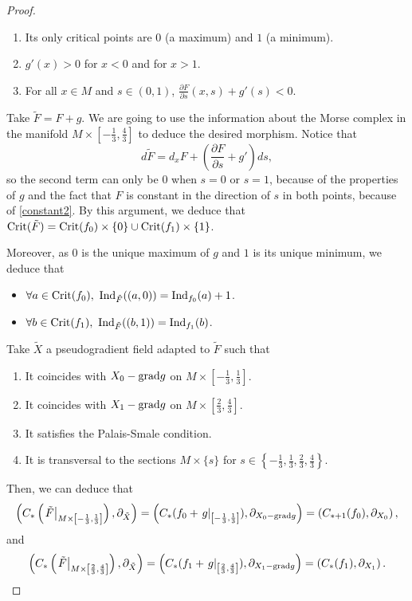\begin{proof}
\begin{enumerate}
	\item Its only critical points are $0$ (a maximum) and $1$ (a minimum).
	\item $g'(x) > 0$ for $x < 0$ and for $x > 1$.
	\item For all $x \in M$ and $s \in (0,1)$, $\frac{\partial F}{\partial s}(x,s) + g'(s) < 0$.
\end{enumerate}

Take $\tilde{F} = F + g$. We are going to use the information about the Morse complex in the manifold $M \times \left[-\frac13,\frac43\right]$ to deduce the desired morphism. Notice that
\begin{displaymath}
d\tilde{F} = d_xF + \left( \frac{\partial F}{\partial s} + g' \right) d s ,
\end{displaymath}
so the second term can only be $0$ when $s=0$ or $s=1$, because of the properties of $g$ and the fact that $F$ is constant in the direction of $s$ in both points, because of \ref{constant2}. By this argument, we deduce that $\mathrm{Crit}(\tilde{F}) = \mathrm{Crit}(f_0) \times \{0\} \cup \mathrm{Crit}(f_1) \times \{1\}$.

Moreover, as $0$ is the unique maximum of $g$ and $1$ is its unique minimum, we deduce that

\begin{itemize}
	\item $\forall a \in \crit(f_0), \ \indx_{\tilde{F}}((a,0)) = \indx_{f_0}(a) + 1$.
	\item $\forall b \in \crit(f_1), \ \indx_{\tilde{F}}((b,1)) = \indx_{f_1}(b)$.
\end{itemize}

Take $\tilde{X}$ a pseudogradient field adapted to $\tilde{F}$ such that

\begin{enumerate}
	\item It coincides with $X_0 - \mathrm{grad} g$ on $M \times \left[-\frac13,\frac13\right]$.
	\item It coincides with $X_1 - \mathrm{grad} g$ on $M \times \left[\frac23,\frac43\right]$.
	\item It satisfies the Palais-Smale condition.
	\item It is transversal to the sections $M \times \{s\}$ for $s \in \left\{-\frac13,\frac13,\frac23,\frac43\right\}$.
\end{enumerate}

Then, we can deduce that
\begin{displaymath}
\left(C_{\ast}\left(\left.\tilde{F}\right|_{M\times \left[-\frac13,\frac13\right]}\right), \partial_{\tilde{X}}\right) =
\left(C_{\ast}(f_0+\left.g\right|_{\left[-\frac13,\frac13\right]}), \partial_{X_0 - \mathrm{grad} g}\right) =
\left(C_{\ast + 1}(f_0), \partial_{X_0}\right) ,
\end{displaymath}
and
\begin{displaymath}
\left(C_{\ast}\left(\left.\tilde{F}\right|_{M\times \left[\frac23,\frac43\right]}\right), \partial_{\tilde{X}}\right) =
\left(C_{\ast}(f_1+\left.g\right|_{\left[\frac23,\frac43\right]}), \partial_{X_1 - \mathrm{grad} g}\right) =
\left(C_{\ast}(f_1), \partial_{X_1}\right) .
\end{displaymath}


\end{proof}
